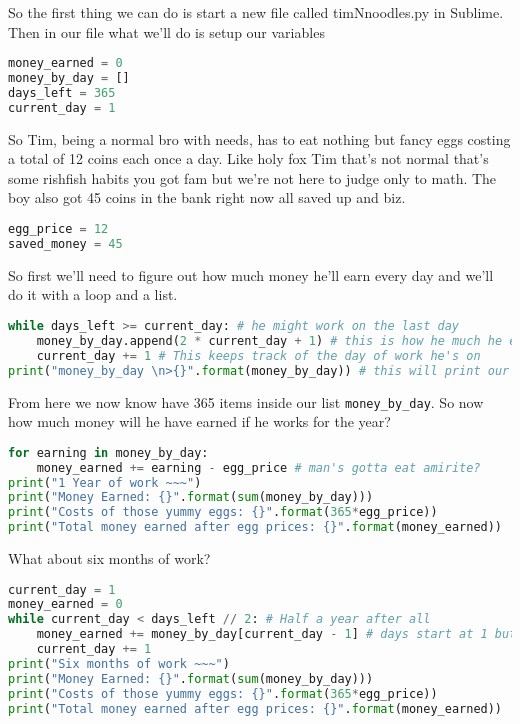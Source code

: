 \documentclass{article}
\begin{document}
So the first thing we can do is start a new file called timNnoodles.py in Sublime. 
Then in our file what we'll do is setup our variables
\begin{lstlisting}[language=Python]
money_earned = 0
money_by_day = [] 
days_left = 365
current_day = 1
\end{lstlisting}

So Tim, being a normal bro with needs, has to eat nothing but fancy eggs costing a total of 
12 coins each once a day. 
Like holy fox Tim that's not normal that's some rishfish habits you got fam but we're not here 
to judge only to math.
The boy also got 45 coins in the bank right now all saved up and biz.
\begin{lstlisting}[language=Python]
egg_price = 12
saved_money = 45
\end{lstlisting}

So first we'll need to figure out how much money he'll earn every day and we'll do it 
with a loop and a list.
\begin{lstlisting}[language=Python]
while days_left >= current_day: # he might work on the last day
    money_by_day.append(2 * current_day + 1) # this is how he much he earns that day
    current_day += 1 # This keeps track of the day of work he's on
print("money_by_day \n>{}".format(money_by_day)) # this will print our list to see it!
\end{lstlisting}

From here we now know have 365 items inside our list \verb|money_by_day|.
So now how much money will he have earned if he works for the year? 
\begin{lstlisting}[language=Python]
for earning in money_by_day:
	money_earned += earning - egg_price # man's gotta eat amirite?
print("1 Year of work ~~~")
print("Money Earned: {}".format(sum(money_by_day)))
print("Costs of those yummy eggs: {}".format(365*egg_price))
print("Total money earned after egg prices: {}".format(money_earned))
\end{lstlisting}

What about six months of work?
\begin{lstlisting}[language=Python]
current_day = 1
money_earned = 0
while current_day < days_left // 2: # Half a year after all
	money_earned += money_by_day[current_day - 1] # days start at 1 but lists start at 0
    current_day += 1
print("Six months of work ~~~")
print("Money Earned: {}".format(sum(money_by_day)))
print("Costs of those yummy eggs: {}".format(365*egg_price))
print("Total money earned after egg prices: {}".format(money_earned))
\end{lstlisting}
\end{document}
